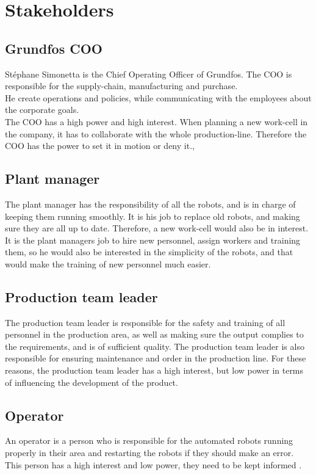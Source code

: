\section{Stakeholders}


\subsection{Grundfos COO}\label{ch:grundfosas-CEO}
Stéphane Simonetta is the Chief Operating Officer of Grundfos. The COO is responsible for the supply-chain, manufacturing and purchase.\\ 
He create operations and policies, while communicating with the employees about the corporate goals.\\
The COO has a high power and high interest. When planning a new work-cell in the company, it has to collaborate with the whole production-line. Therefore the COO has the power to set it in motion or deny it.\cite{Grundfos},\cite{COO}\\

\subsection{Plant manager}\label{ch:Plant-manager} 
The plant manager has the responsibility of all the robots, and is in charge of keeping them running smoothly. It is his job to replace old robots, and making sure they are all up to date. Therefore, a new work-cell would also be in interest. It is the plant managers job to hire new personnel, assign workers and training them, so he would also be interested in the simplicity of the robots, and that would make the training of new personnel much easier. \cite{plantmanager} \\

\subsection{Production team leader}\label{ch:Production-team-leader}
The production team leader is responsible for the safety and training of all personnel in the production area, as well as making sure the output complies to the requirements, and is of sufficient quality. The production team leader is also responsible for ensuring maintenance and order in the production line. For these reasons, the production team leader has a high interest, but low power in terms of influencing the development of the product. \cite{Productionteamleader} 


\subsection{Operator}\label{ch:grundfosemp-stake}
An operator is a person who is responsible for the automated robots running properly in their area and restarting the robots if they should make an error. This person has a high interest and low power, they need to be kept informed \cite{Operator}.\\ 


